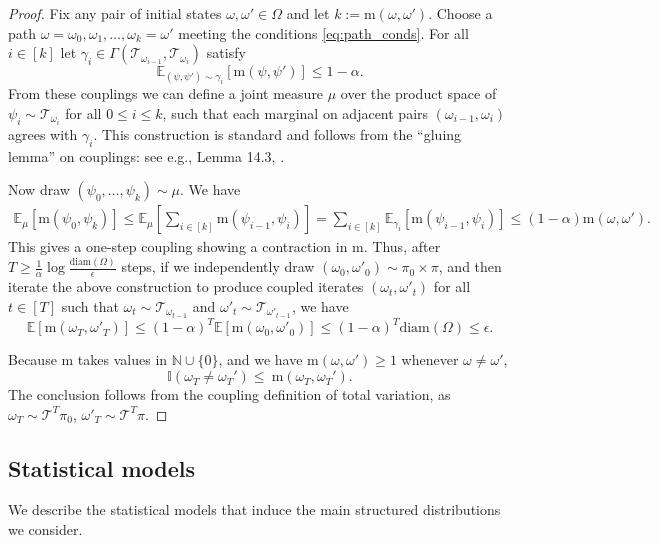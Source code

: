 \documentclass[11pt]{article}
\newcommand{\eps}{\epsilon}
\newcommand{\1}{\mathbf{1}}
\newcommand{\0}{\mathbf{0}}
\newcommand{\ind}{\mathbb{I}}
\newcommand{\E}{\mathbb{E}}
\newcommand{\Brack}[1]{\left[#1\right]}
\newcommand{\met}{\mathrm{m}}
\newcommand{\calT}{{\mathcal{T}}}
\begin{document}
\begin{proof}
Fix any pair of initial states $\omega,\omega'\in\Omega$ and let $k:=\met(\omega,\omega')$.
Choose a path $\omega=\omega_0,\omega_1,\ldots,\omega_k=\omega'$ meeting the conditions \eqref{eq:path_conds}. For all $i \in [k]$ let $\gamma_i \in \Gamma(\calT_{\omega_{i - 1}}, \calT_{\omega_i})$ satisfy
\[\E_{(\psi, \psi') \sim \gamma_i}\Brack{\met(\psi, \psi')} \le 1 - \alpha.\]
From these couplings we can define a joint measure $\mu$ over the product space of $\psi_i \sim \calT_{\omega_i}$ for all $0 \le i \le k$, such that each marginal on adjacent pairs $(\omega_{i - 1}, \omega_i)$ agrees with $\gamma_i$. This construction is standard and follows from the ``gluing lemma'' on couplings: see e.g., Lemma 14.3, \cite{LevinPW09}.

Now draw $(\psi_0, \ldots, \psi_k) \sim \mu$. We have
\begin{align*}
\E_\mu\Brack{\met(\psi_0, \psi_k)} \le \E_\mu\Brack{\sum_{i \in [k]} \met(\psi_{i - 1}, \psi_i)} = \sum_{i \in [k]} \E_{\gamma_i}\Brack{\met(\psi_{i - 1}, \psi_i)} \le (1 - \alpha)\met(\omega, \omega').
\end{align*}
This gives a one-step coupling showing a contraction in $\met$. Thus, after $T \ge \frac 1 \alpha \log \frac{\textrm{diam}(\Omega)}{\eps}$ steps, if we independently draw $(\omega_0, \omega'_0) \sim \pi_0 \times \pi$, and then iterate the above construction to produce coupled iterates $(\omega_t, \omega'_t)$ for all $t \in [T]$ such that $\omega_t \sim \calT_{\omega_{t - 1}}$ and $\omega'_t \sim \calT_{\omega'_{t - 1}}$, we have
\[\E\Brack{\met(\omega_T, \omega'_T)} \le (1 - \alpha)^T \E\Brack{\met(\omega_0, \omega'_0)} \le (1 - \alpha)^T \textrm{diam}(\Omega) \le \eps.\]

Because $\met$ takes values in $\mathbb{N} \cup \{0\}$, and we have $\met(\omega,\omega')\ge 1$ whenever $\omega\neq \omega'$,
\[
\ind(\omega_T\neq \omega_T') \le\ \met(\omega_T,\omega_T').
\]
The conclusion follows from the coupling definition of total variation, as $\omega_T \sim \calT^T \pi_0$, $\omega'_T \sim \calT^T \pi$.
\end{proof}

\subsection{Statistical models}\label{ssec:models}

We describe the statistical models that induce the main structured distributions we consider.
\end{document}
